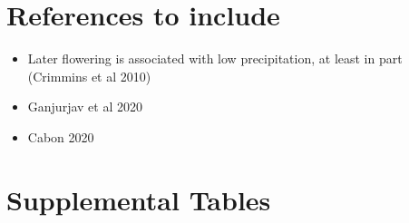 \documentclass{article}
\begin{document}
\section*{References to include}
\begin{itemize}
\item Later flowering is  associated with low precipitation, at least in part (Crimmins et al 2010)
\item Ganjurjav et al 2020
\item Cabon 2020
\end{itemize}

\clearpage
\section* {Supplemental Tables}

\end{document}
